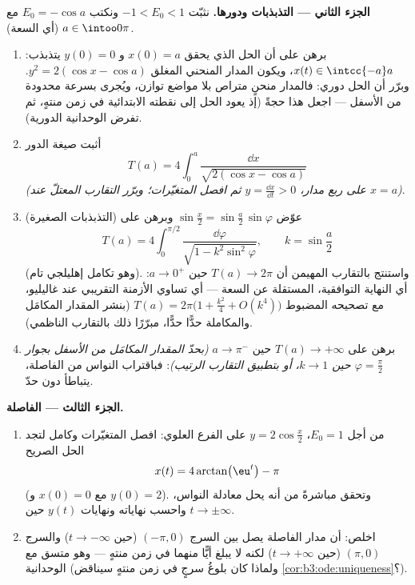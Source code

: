 \begin{problem}
\medskip
\noindent\textbf{الجزء الثاني --- التذبذبات ودورها.} نثبّت
$-1 < E_0 < 1$ ونكتب $E_0 = -\cos a$ مع $a \in
\intoo0\pi$ (أي السعة).
\begin{enumerate}[resume]
  \item برهن على أن الحل الذي يحقق $x(0) = a$ و $y(0) = 0$
        يتذبذب: $x(t) \in \intcc{-a}a$، ويكون المدار المنحني المغلق $y^2 = 2(\cos x - \cos a)$.
        وبرّر أن الحل دوري: فالمدار منحنٍ متراص بلا مواضع
        توازن، ويُجرى بسرعة محدودة من الأسفل --- اجعل هذا
        حجةً (إذ يعود الحل إلى نقطته الابتدائية في زمن منتهٍ،
        ثم تفرض الوحدانية الدورية).
  \item أثبت صيغة الدور
        \[
        T(a) = 4\int_0^{a}\frac{\dd x}{\sqrt{2(\cos x -
        \cos a)}}
        \]
        \emph{(على ربع مدار، $y = \frac{\dd x}{\dd t} >
        0$ ثم افصل المتغيّرات؛ وبرّر
        التقارب المعتلّ عند $x = a$)}.
  \item (التذبذبات الصغيرة) عوّض $\sin\frac x2 =
        \sin\frac a2\,\sin\varphi$ وبرهن على
        \[
        T(a) = 4\int_0^{\pi/2}\frac{\dd\varphi}{\sqrt{1 -
        k^2\sin^2\varphi}},
        \qquad k = \sin\frac a2
        \]
        (وهو تكامل إهليلجي تام). واستنتج بالتقارب المهيمن أن
        $T(a) \to 2\pi$ حين $a \to 0^+$: أي النهاية التوافقية،
        المستقلة عن السعة --- أي تساوي الأزمنة التقريبي عند
        غاليليو، مع تصحيحه المضبوط $T(a) = 2\pi\bigl(1 + \frac{k^2}4 +
        O(k^4)\bigr)$ (بنشر المقدار
        المكامَل والمكاملة حدًّا حدًّا، مبرّرًا ذلك بالتقارب
        الناظمي).
  \item برهن على $T(a) \to +\infty$ حين $a \to \pi^-$ \emph{(بحدّ المقدار
        المكامَل من الأسفل بجوار $\varphi =
        \frac\pi2$ حين $k \to 1$، أو
        بتطبيق التقارب الرتيب)}: فباقتراب النواس من الفاصلة،
        يتباطأ دون حدّ.
\end{enumerate}

\medskip
\noindent\textbf{الجزء الثالث --- الفاصلة.}
\begin{enumerate}[resume]
  \item من أجل $E_0 = 1$، $y = 2\cos\frac x2$ على الفرع العلوي: افصل
        المتغيّرات وكامل لتجد الحل الصريح
        \[
        x(t) = 4\arctan\bigl(\eu^{t}\bigr) - \pi
        \]
        (مع $x(0) = 0$ و $y(0) = 2$). وتحقق مباشرةً من أنه
        يحل معادلة النواس، واحسب نهاياته ونهايات $y(t)$ حين
        $t \to
        \pm\infty$.
  \item اخلص: أن مدار الفاصلة يصل بين السرج $(-\pi, 0)$ (حين
        $t \to -\infty$) والسرج $(\pi, 0)$ (حين
        $t \to +\infty$) لكنه لا يبلغ أيًّا منهما في زمن منتهٍ
        --- وهو متسق مع الوحدانية (ولماذا كان بلوغُ سرجٍ في
        زمن منتهٍ سيناقض \cref{cor:b3:ode:uniqueness}؟).
\end{enumerate}


\end{problem}
